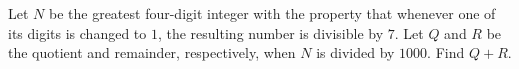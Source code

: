 Let $N$ be the greatest four-digit integer with the property that whenever one of its digits is changed to $1$, the resulting number is divisible by $7$. Let $Q$ and $R$ be the quotient and remainder, respectively, when $N$ is divided by $1000$. Find $Q+R$.
